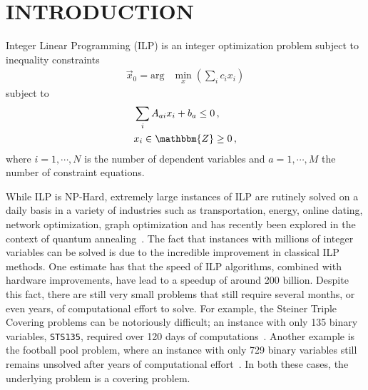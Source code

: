 \documentclass[10pt]{iopart}
\begin{document}

\maketitle

\flushbottom
\maketitle

\section{INTRODUCTION}
\label{sec:introduction}
Integer Linear Programming (ILP) is an integer optimization problem subject to inequality constraints
\begin{align}
 \label{eq:initial-ip-def}
 \vec x_0 = \mathrm{arg} & \min\limits_{x}\left(\sum_i c_i x_i\right)
\end{align}
subject to
\begin{align}
 \label{eq:ilp-constraints}
  & \sum_i A_{ai}x_i +b_a \leq 0 \,, \\
  & x_i  \in \mathbbm{Z} \geq 0\, ,
\end{align}
where $i=1, \cdots,  N$ is the number of dependent variables and $a=1, \cdots, M$ the number of constraint equations.

While ILP is NP-Hard, extremely large instances of ILP are rutinely solved on a daily basis in a variety of industries such as transportation, energy, online dating, network optimization, graph optimization and has recently been explored in the context of quantum annealing~\cite{2020arXiv200713788H}.
The fact that instances with millions of integer variables can be solved is due to the incredible improvement in classical ILP methods.
One estimate has that the speed of ILP algorithms, combined with hardware improvements, have lead to a speedup of around 200 billion\cite{bertsimas2014statistics}.
Despite this fact, there are still very small problems that still require several months, or even years, of computational effort to solve. For example, the Steiner Triple Covering problems can be notoriously difficult; an instance with only 135 binary variables, \texttt{STS135}, required over 120 days of computations~\cite{ostrowski2011solving}. Another example is the football pool problem, where an instance with only 729 binary variables still remains unsolved after years of computational effort~\cite{linderoth2009improving}.
In both these cases, the underlying problem is a covering problem.
\end{document}
